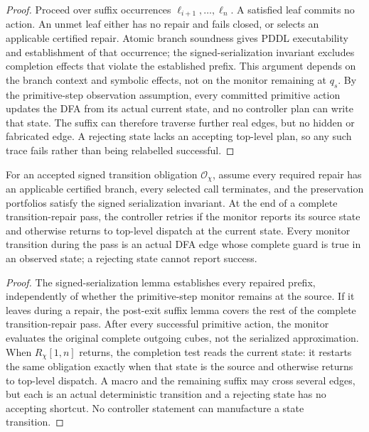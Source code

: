 \begin{proof}
Proceed over suffix occurrences $\ell_{i+1},\ldots,\ell_n$. A satisfied leaf commits
no action. An unmet leaf either has no repair and fails closed, or selects an
applicable certified repair. Atomic branch soundness gives PDDL executability and
establishment of that occurrence; the signed-serialization invariant excludes
completion effects that violate the established prefix. This argument depends
on the branch context and symbolic effects, not on the monitor remaining at
$q_s$. By the primitive-step observation assumption, every committed primitive action
updates the DFA from its actual current state, and no controller plan can write
that state. The suffix can therefore traverse further real edges, but no hidden
or fabricated edge. A rejecting state lacks an accepting top-level plan, so any
such trace fails rather than being relabelled successful.
\end{proof}

\begin{proposition}
For an accepted signed transition obligation $\mathcal O_\chi$, assume every
required repair has an applicable
certified branch, every selected call terminates, and the preservation portfolios
satisfy the signed serialization invariant. At the end of a complete
transition-repair pass, the
controller retries if the monitor reports its source state and otherwise returns
to top-level dispatch at the current state. Every monitor transition during the
pass is an actual DFA edge whose complete guard is true in an observed state;
a rejecting state cannot report success.
\end{proposition}

\begin{proof}
The signed-serialization lemma establishes every repaired prefix, independently
of whether the primitive-step monitor remains at the source. If it leaves during
a repair, the post-exit suffix lemma covers the rest of the complete
transition-repair pass. After
every successful primitive action, the monitor evaluates the original complete
outgoing cubes, not the serialized approximation. When $R_\chi[1,n]$ returns,
the completion test reads the current state: it restarts the same obligation exactly
when that state is the source and otherwise returns to top-level dispatch. A
macro and the remaining suffix may cross several edges, but each is an actual
deterministic transition and a rejecting state has no accepting shortcut. No
controller statement can manufacture a state transition.
\end{proof}

